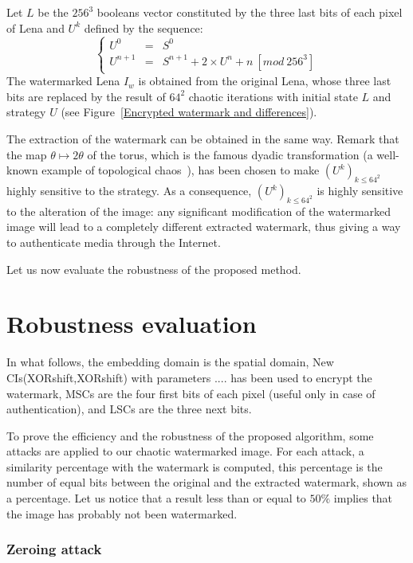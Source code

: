 Let $L$ be the $256^3$ booleans vector constituted by the three last bits of each pixel of Lena and $U^k$ defined by the sequence:
\begin{equation}
\left\{
\begin{array}{lll}
U^{0} & = & S^{0} \\
U^{n+1} & = & S^{n+1}+2\times U^{n}+n ~ [mod ~ 256^3]%
\end{array}%
\right.
\end{equation}
The watermarked Lena $I_w$ is obtained from the original Lena, whose three last bits are replaced by the result of $64^2$ chaotic iterations with initial state $L$ and strategy $U$ (see Figure~\ref{Encrypted watermark and differences}).

The extraction of the watermark can be obtained in the same way. Remark that the map $\theta \mapsto 2\theta $ of the torus, which is the famous dyadic transformation (a well-known example of topological chaos~\cite{Dev89}), has been chosen to make $(U^{k})_{k \leqslant 64^2}$ highly sensitive to the strategy. As a consequence, $(U^{k})_{k \leqslant 64^2}$ is highly sensitive to the alteration of the image: any significant modification of the watermarked image will lead to a completely different extracted watermark, thus giving a way to authenticate media through the Internet.


Let us now evaluate the robustness of the proposed method.


\section{Robustness evaluation}

In what follows, the embedding domain is the spatial domain, New CIs(XORshift,XORshift) with parameters $....$ has been used to encrypt the watermark, MSCs are the four first bits of each pixel (useful only in case of authentication), and LSCs are the three next bits.

To prove the efficiency and the robustness of the proposed algorithm, some
attacks are applied to our chaotic watermarked image. For each attack, a
similarity percentage with the watermark is computed, this percentage is the
number of equal bits between the original and the extracted watermark, shown
as a percentage. Let us notice that a result less than or equal to $50\%$
implies that the image has probably not been watermarked.

\subsubsection{Zeroing attack}


